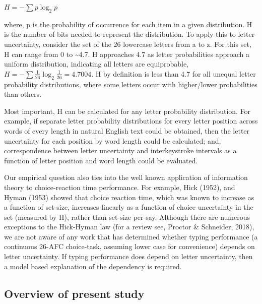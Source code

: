 \documentclass[,man,floatsintext]{apa6}
\begin{document}
\(H = -\sum p \log_2 p\)

where, p is the probability of occurrence for each item in a given distribution. H is the number of bits needed to represent the distribution. To apply this to letter uncertainty, consider the set of the 26 lowercase letters from a to z. For this set, H can range from 0 to \textasciitilde{}4.7. H approaches 4.7 as letter probabilities approach a uniform distribution, indicating all letters are equiprobable, \(H = -\sum \frac{1}{26} \log_2 \frac{1}{26} = 4.7004\). H by definition is less than 4.7 for all unequal letter probability distributions, where some letters occur with higher/lower probabilities than others.

Most important, H can be calculated for any letter probability distribution. For example, if separate letter probability distributions for every letter position across words of every length in natural English text could be obtained, then the letter uncertainty for each position by word length could be calculated; and, correspondence between letter uncertainty and interkeystroke intervals as a function of letter position and word length could be evaluated.

Our empirical question also ties into the well known application of information theory to choice-reaction time performance. For example, Hick (1952), and Hyman (1953) showed that choice reaction time, which was known to increase as a function of set-size, increases linearly as a function of choice uncertainty in the set (measured by H), rather than set-size per-say. Although there are numerous exceptions to the Hick-Hyman law (for a review see, Proctor \& Schneider, 2018), we are not aware of any work that has determined whether typing performance (a continuous 26-AFC choice-task, assuming lower case for convenience) depends on letter uncertainty. If typing performance does depend on letter uncertainty, then a model based explanation of the dependency is required.

\hypertarget{overview-of-present-study}{%
\subsection{Overview of present study}\label{overview-of-present-study}}
\end{document}
